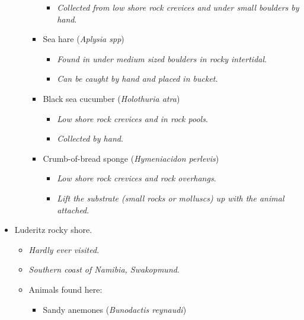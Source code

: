 \documentclass[
  12pt,
]{report}
\providecommand{\tightlist}{%
  \setlength{\itemsep}{0pt}\setlength{\parskip}{0pt}}\usepackage{longtable,booktabs,array}
\begin{document}
\begin{itemize}
\begin{itemize}
\begin{itemize}
      \begin{itemize}
      \tightlist
      \item
        \emph{Collected from low shore rock crevices and under small
        boulders by hand}.
      \end{itemize}
    \item
      Sea hare (\emph{Aplysia spp})

      \begin{itemize}
      \tightlist
      \item
        \emph{Found in under medium sized boulders in rocky intertidal}.
      \item
        \emph{Can be caught by hand and placed in bucket}.
      \end{itemize}
    \item
      Black sea cucumber (\emph{Holothuria atra})

      \begin{itemize}
      \tightlist
      \item
        \emph{Low shore rock crevices and in rock pools}.
      \item
        \emph{Collected by hand}.
      \end{itemize}
    \item
      Crumb-of-bread sponge (\emph{Hymeniacidon perlevis})

      \begin{itemize}
      \tightlist
      \item
        \emph{Low shore rock crevices and rock overhangs}.
      \item
        \emph{Lift the substrate (small rocks or molluscs) up with the
        animal attached}.
      \end{itemize}
    \end{itemize}
  \end{itemize}
\item
  Luderitz rocky shore.

  \begin{itemize}
  \tightlist
  \item
    \emph{Hardly ever visited}.
  \item
    \emph{Southern coast of Namibia, Swakopmund}.
  \item
    Animals found here:

    \begin{itemize}
    \tightlist
    \item
      Sandy anemones (\emph{Bunodactis reynaudi})


\end{itemize}
\end{itemize}
\end{itemize}
\end{document}
